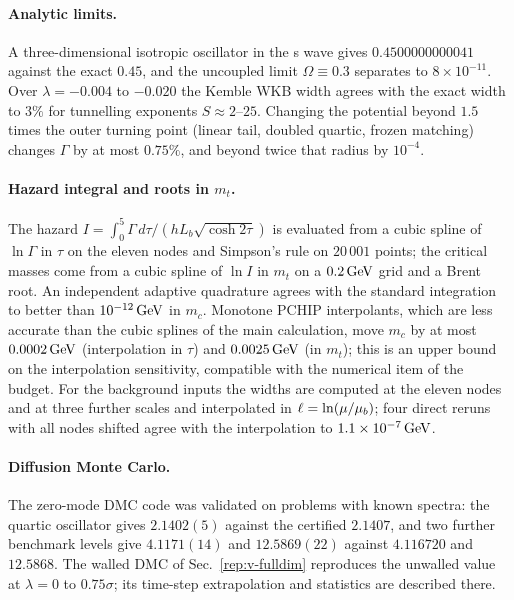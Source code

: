 \paragraph{Analytic limits.}
A three-dimensional isotropic oscillator in the s wave gives $0.4500000000041$ against the exact $0.45$, and the uncoupled limit $\Omega\equiv0.3$ separates to $8\times10^{-11}$. %
Over $\lambda=-0.004$ to $-0.020$ the Kemble WKB width agrees with the exact width to $3\%$ for tunnelling exponents $S\approx2$--$25$. %
Changing the potential beyond $1.5$ times the outer turning point (linear tail, doubled quartic, frozen matching) changes $\Gamma$ by at most $0.75\%$, and beyond twice that radius by $10^{-4}$. %

\paragraph{Hazard integral and roots in $m_t$.}
The hazard $I=\int_0^5\Gamma\,d\tau/(hL_b\sqrt{\cosh2\tau})$ is evaluated from a cubic spline of $\ln\Gamma$ in $\tau$ on the eleven nodes and Simpson's rule on $20\,001$ points; the critical masses come from a cubic spline of $\ln I$ in $m_t$ on a $0.2\,\mathrm{GeV}$ grid and a Brent root.
An independent adaptive quadrature agrees with the standard integration to better than $10^{-12}\,\mathrm{GeV}$ in $m_c$.
Monotone PCHIP interpolants, which are less accurate than the cubic splines of the main calculation, move $m_c$ by at most $0.0002\,\mathrm{GeV}$ (interpolation in $\tau$) and $0.0025\,\mathrm{GeV}$ (in $m_t$); this is an upper bound on the interpolation sensitivity, compatible with the numerical item of the budget. %
For the background inputs the widths are computed at the eleven nodes and at three further scales and interpolated in $\ell=\ln(\mu/\mu_b)$; four direct reruns with all nodes shifted agree with the interpolation to $1.1\times10^{-7}\,\mathrm{GeV}$. %

\paragraph{Diffusion Monte Carlo.}
The zero-mode DMC code was validated on problems with known spectra: the quartic oscillator gives $2.1402(5)$ against the certified $2.1407$, and two further benchmark levels give $4.1171(14)$ and $12.5869(22)$ against $4.116720$ and $12.5868$. %
The walled DMC of Sec.~\ref{rep:v-fulldim} reproduces the unwalled value at $\lambda=0$ to $0.75\sigma$; its time-step extrapolation and statistics are described there.

